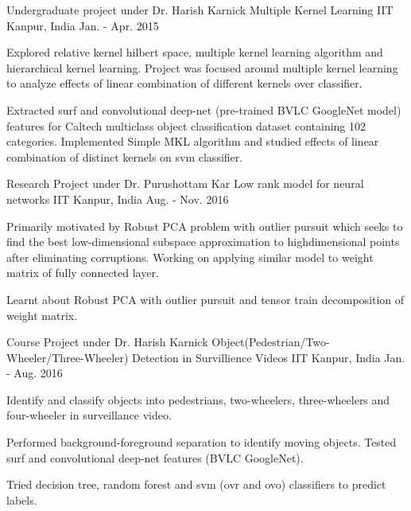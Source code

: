 \begin{cventries}
	
	\cventry
	{Undergraduate project under Dr. Harish Karnick} %
	{Multiple Kernel Learning} %
	{IIT Kanpur, India} %
	{Jan. - Apr. 2015} %
	{
		\begin{cvitems} %
			 \item {Explored relative kernel hilbert space, multiple kernel learning algorithm and hierarchical kernel learning. Project was focused around multiple kernel learning to analyze effects of linear combination of different kernels over classifier.}
			 \item {Extracted surf and convolutional deep-net (pre-trained BVLC GoogleNet model) features for Caltech multiclass object classification dataset containing 102 categories. Implemented Simple MKL algorithm and studied effects of linear combination of distinct kernels on svm classifier.}
		\end{cvitems}
	}
	
	\cventry
	{Research Project under Dr. Purushottam Kar} %
	{Low rank model for neural networks} %
	{IIT Kanpur, India} %
	{Aug. - Nov. 2016} %
	{
		\begin{cvitems} %
			\item { Primarily motivated by Robust PCA problem with outlier pursuit which seeks to find the best low-dimensional subspace approximation to highdimensional points after eliminating corruptions. Working on applying similar model to weight matrix of fully connected layer.}
			\item {Learnt about Robust PCA with outlier pursuit and tensor train decomposition of weight matrix.}
		\end{cvitems}
	}
	
	\cventry
	{Course Project under Dr. Harish Karnick} %
	{Object(Pedestrian/Two-Wheeler/Three-Wheeler) Detection in Survillience Videos} %
	{IIT Kanpur, India} %
	{Jan. - Aug. 2016} %
	{
		\begin{cvitems} %
		\item {Identify and classify objects into pedestrians, two-wheelers, three-wheelers and four-wheeler in surveillance video.}
		\item {Performed background-foreground separation to identify moving objects. Tested surf and convolutional deep-net features (BVLC GoogleNet).}
		\item {Tried decision tree, random forest and svm (ovr and ovo) classifiers to predict labels.}
		\end{cvitems}
	}
	

\end{cventries}
